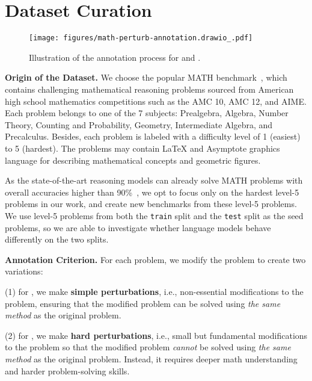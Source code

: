 \section{Dataset Curation}
\label{sec:data-curation}


\begin{figure*}[t]
\centering
    \texttt{[image: figures/math-perturb-annotation.drawio\_.pdf]}
\caption{Illustration of the annotation process for \SAME and \HARD. }
\label{fig:annotation}
\end{figure*}


\textbf{Origin of the Dataset.} 
We choose the popular MATH benchmark~\citep{hendrycksmath2021}, which contains challenging mathematical reasoning problems sourced from American high school mathematics competitions such as the AMC 10, AMC 12, and AIME. Each problem belongs to one of the 7 subjects: Prealgebra, Algebra, Number Theory, Counting and Probability, Geometry, Intermediate Algebra, and Precalculus. Besides, each problem is labeled with a difficulty level of 1 (easiest) to 5 (hardest). The problems may contain LaTeX and Asymptote graphics language for describing mathematical concepts and geometric figures.

As the state-of-the-art reasoning models can already solve MATH problems with overall accuracies higher than 90\%~\citep{openaio1, team2024gemini, deepseekai2025deepseekr1incentivizingreasoningcapability}, we opt to focus only on the hardest level-5 problems in our work, and create new benchmarks from these level-5 problems.
We use level-5 problems from both the \texttt{train} split and the \texttt{test} split as the seed problems, so we are able to investigate whether language models behave differently on the two splits. 



\textbf{Annotation Criterion.}
For each problem, we modify the problem to create two variations:

(1) for \SAME, we make \textbf{simple perturbations}, i.e., non-essential modifications to the problem, ensuring that the modified problem can be solved using \textit{the same method} as the original problem. 

(2) for \HARD, we make \textbf{hard perturbations}, i.e., small but fundamental modifications to the problem so that the modified problem \emph{cannot} be solved using \textit{the same method} as the original problem. Instead, it requires deeper math understanding and harder problem-solving skills.

